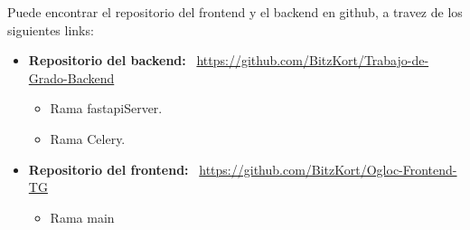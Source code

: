  Puede encontrar el repositorio del frontend y el backend en github, a travez de los siguientes links:

\begin{itemize}
\item \textbf{Repositorio del backend:} \
\url{https://github.com/BitzKort/Trabajo-de-Grado-Backend}
\begin{itemize}
    \item Rama fastapiServer.
    \item Rama Celery.
\end{itemize}
\item \textbf{Repositorio del frontend:} \
\url{https://github.com/BitzKort/Ogloc-Frontend-TG}
    \begin{itemize}
    \item Rama main
    \end{itemize}
\end{itemize}